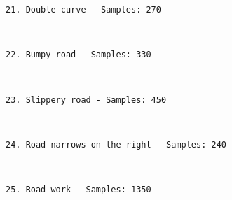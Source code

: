 \documentclass[11pt]{article}
\begin{document}
    \begin{Verbatim}[commandchars=\\\{\}]
21. Double curve - Samples: 270

    \end{Verbatim}

    \begin{center}
    \end{center}
    { \hspace*{\fill} \\}
    
    \begin{Verbatim}[commandchars=\\\{\}]
22. Bumpy road - Samples: 330

    \end{Verbatim}

    \begin{center}
    \end{center}
    { \hspace*{\fill} \\}
    
    \begin{Verbatim}[commandchars=\\\{\}]
23. Slippery road - Samples: 450

    \end{Verbatim}

    \begin{center}
    \end{center}
    { \hspace*{\fill} \\}
    
    \begin{Verbatim}[commandchars=\\\{\}]
24. Road narrows on the right - Samples: 240

    \end{Verbatim}

    \begin{center}
    \end{center}
    { \hspace*{\fill} \\}
    
    \begin{Verbatim}[commandchars=\\\{\}]
25. Road work - Samples: 1350

    \end{Verbatim}
\end{document}

